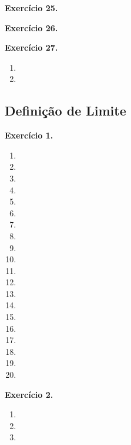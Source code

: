 \documentclass[12pt,a4paper]{article}
\begin{document}
\vspace{0.5cm}
\noindent\textbf{Exercício 25.}

\vspace{0.5cm}
\noindent\textbf{Exercício 26.}

\vspace{0.5cm}
\noindent\textbf{Exercício 27.}
\begin{enumerate}
    \renewcommand{\theenumi}{\alph{enumi}}
    \renewcommand{\labelenumi}{\theenumi)}
    \item 
    \item 
\end{enumerate}

\subsection{Definição de Limite}

\vspace{0.5cm}
\noindent\textbf{Exercício 1.}
\begin{enumerate}
    \renewcommand{\theenumi}{\alph{enumi}}
    \renewcommand{\labelenumi}{\theenumi)}
    \item 
    \item 
    \item 
    \item 
    \item 
    \item 
    \item 
    \item 
    \item 
    \item 
    \item 
    \item 
    \item 
    \item 
    \item 
    \item 
    \item 
    \item 
    \item 
    \item 
\end{enumerate}

\vspace{0.5cm}
\noindent\textbf{Exercício 2.}
\begin{enumerate}
    \renewcommand{\theenumi}{\alph{enumi}}
    \renewcommand{\labelenumi}{\theenumi)}
    \item 
    \item 
    \item 
\end{enumerate}
\end{document}
